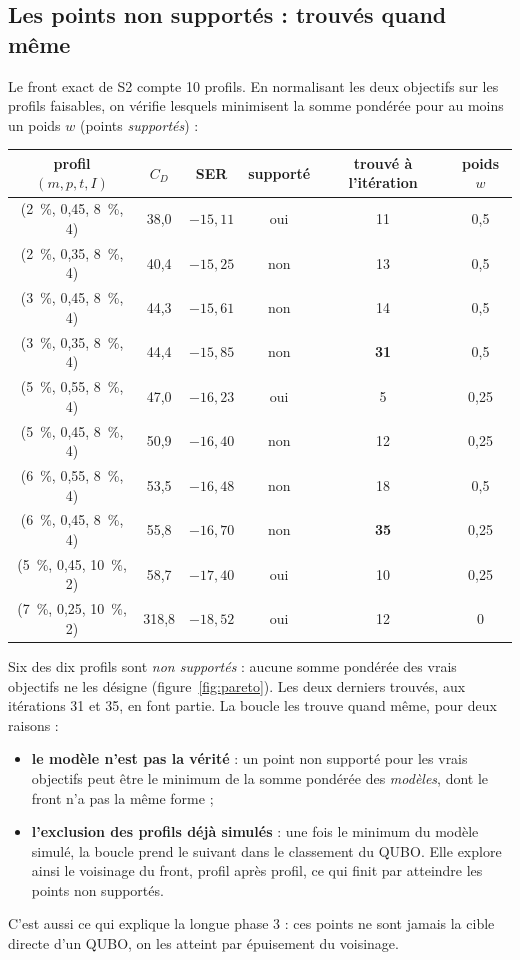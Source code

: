 \subsection{Les points non supportés : trouvés quand même}
Le front exact de S2 compte 10 profils. En normalisant les deux objectifs sur les profils faisables, on vérifie lesquels minimisent la somme pondérée pour au moins un poids $w$ (points \emph{supportés}) :
\begin{center}
\renewcommand{\arraystretch}{1.15}
\small
\begin{tabular}{cccccc}
\toprule
profil $(m,p,t,I)$ & $C_D$ & SER & supporté & trouvé à l'itération & poids $w$ \\
\midrule
(2~\%, 0,45, 8~\%, 4) & 38,0 & $-15{,}11$ & oui & 11 & 0,5 \\
(2~\%, 0,35, 8~\%, 4) & 40,4 & $-15{,}25$ & non & 13 & 0,5 \\
(3~\%, 0,45, 8~\%, 4) & 44,3 & $-15{,}61$ & non & 14 & 0,5 \\
(3~\%, 0,35, 8~\%, 4) & 44,4 & $-15{,}85$ & non & \textbf{31} & 0,5 \\
(5~\%, 0,55, 8~\%, 4) & 47,0 & $-16{,}23$ & oui & 5 & 0,25 \\
(5~\%, 0,45, 8~\%, 4) & 50,9 & $-16{,}40$ & non & 12 & 0,25 \\
(6~\%, 0,55, 8~\%, 4) & 53,5 & $-16{,}48$ & non & 18 & 0,5 \\
(6~\%, 0,45, 8~\%, 4) & 55,8 & $-16{,}70$ & non & \textbf{35} & 0,25 \\
(5~\%, 0,45, 10~\%, 2) & 58,7 & $-17{,}40$ & oui & 10 & 0,25 \\
(7~\%, 0,25, 10~\%, 2) & 318,8 & $-18{,}52$ & oui & 12 & 0 \\
\bottomrule
\end{tabular}
\end{center}
Six des dix profils sont \emph{non supportés} : aucune somme pondérée des vrais objectifs ne les désigne (figure~\ref{fig:pareto}). Les deux derniers trouvés, aux itérations 31 et 35, en font partie. La boucle les trouve quand même, pour deux raisons :
\begin{itemize}
\item \textbf{le modèle n'est pas la vérité} : un point non supporté pour les vrais objectifs peut être le minimum de la somme pondérée des \emph{modèles}, dont le front n'a pas la même forme ;
\item \textbf{l'exclusion des profils déjà simulés} : une fois le minimum du modèle simulé, la boucle prend le suivant dans le classement du QUBO. Elle explore ainsi le voisinage du front, profil après profil, ce qui finit par atteindre les points non supportés.
\end{itemize}
C'est aussi ce qui explique la longue phase 3 : ces points ne sont jamais la cible directe d'un QUBO, on les atteint par épuisement du voisinage.

